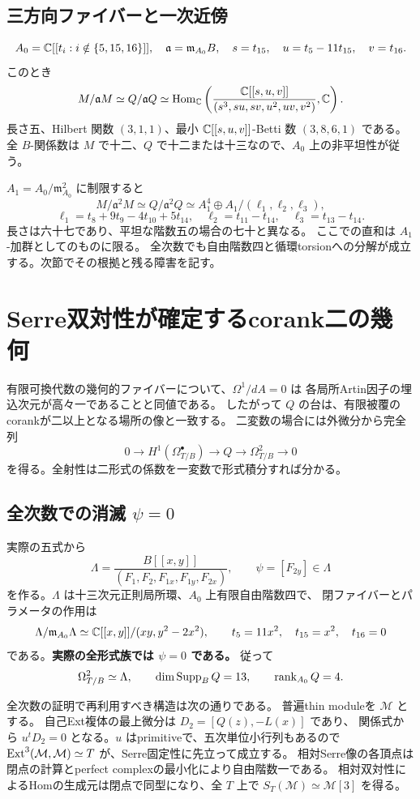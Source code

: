 \subsection{三方向ファイバーと一次近傍}
\[
 A_0=\mathbb C[[t_i:i\notin\{5,15,16\}]],\quad
 \mathfrak a=\mathfrak m_{A_0}B,\quad
 s=t_{15},\quad u=t_5-11t_{15},\quad v=t_{16}.
\]
このとき
\[
 M/\mathfrak aM\simeq Q/\mathfrak aQ
 \simeq\operatorname{Hom}_\mathbb C\left(
 \frac{\mathbb C[[s,u,v]]}{(s^3,su,sv,u^2,uv,v^2)},\mathbb C\right).
\]
長さ五、Hilbert 関数 $(3,1,1)$、最小 $\mathbb C[[s,u,v]]$-Betti 数 $(3,8,6,1)$ である。
全 $B$-関係数は $M$ で十二、$Q$ で十二または十三なので、$A_0$ 上の非平坦性が従う。

$A_1=A_0/\mathfrak m_{A_0}^2$ に制限すると
\[
 M/\mathfrak a^2M\simeq Q/\mathfrak a^2Q
 \simeq A_1^4\oplus A_1/(\ell_1,\ell_2,\ell_3),
\]
\[
 \ell_1=t_8+9t_9-4t_{10}+5t_{14},\quad
 \ell_2=t_{11}-t_{14},\quad\ell_3=t_{13}-t_{14}.
\]
長さは六十七であり、平坦な階数五の場合の七十と異なる。
ここでの直和は $A_1$-加群としてのものに限る。
全次数でも自由階数四と循環torsionへの分解が成立する。次節でその根拠と残る障害を記す。

\section{Serre双対性が確定するcorank二の幾何}

有限可換代数の幾何的ファイバーについて、$\Omega^1/dA=0$ は
各局所Artin因子の埋込次元が高々一であることと同値である。
したがって $Q$ の台は、有限被覆のcorankが二以上となる場所の像と一致する。
二変数の場合には外微分から完全列
\[
 0\longrightarrow H^1(\Omega^\bullet_{T/B})
 \longrightarrow Q\longrightarrow\Omega^2_{T/B}\longrightarrow0
\]
を得る。全射性は二形式の係数を一変数で形式積分すれば分かる。

\subsection{全次数での消滅 $\psi=0$}
実際の五式から
\[
 \Lambda=\frac{B[[x,y]]}{(F_1,F_2,F_{1x},F_{1y},F_{2x})},
 \qquad\psi=[F_{2y}]\in\Lambda
\]
を作る。$\Lambda$ は十三次元正則局所環、$A_0$ 上有限自由階数四で、
閉ファイバーとパラメータの作用は
\[
 \Lambda/\mathfrak m_{A_0}\Lambda
 \simeq\mathbb C[[x,y]]/(xy,y^2-2x^2),\qquad
 t_5=11x^2,\quad t_{15}=x^2,\quad t_{16}=0
\]
である。\textbf{実際の全形式族では $\psi=0$ である。} 従って
\[
 \Omega^2_{T/B}\simeq\Lambda,\qquad
 \dim\operatorname{Supp}_BQ=13,\qquad\operatorname{rank}_{A_0}Q=4.
\]

全次数の証明で再利用すべき構造は次の通りである。
普遍thin moduleを $\mathcal M$ とする。
自己Ext複体の最上微分は $D_2=[Q(z),-L(x)]$ であり、
関係式から $u^tD_2=0$ となる。$u$ はprimitiveで、五次単位小行列もあるので
$\operatorname{Ext}^3(\mathcal M,\mathcal M)\simeq T$ が、Serre固定性に先立って成立する。
相対Serre像の各頂点は閉点の計算とperfect complexの最小化により自由階数一である。
相対双対性によるHomの生成元は閉点で同型になり、全 $T$ 上で
$S_T(\mathcal M)\simeq\mathcal M[3]$ を得る。

